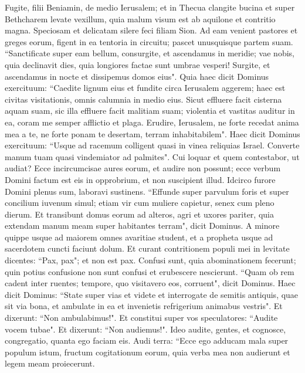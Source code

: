 \begin{biblechapter}  
\verse Fugite, filii Beniamin, de medio Ierusalem; et in Thecua clangite bucina et super Bethcharem levate vexillum, quia malum visum est ab aquilone et contritio magna. 
\verse Speciosam et delicatam silere feci filiam Sion. 
\verse Ad eam venient pastores et greges eorum, figent in ea tentoria in circuitu; pascet unusquisque partem suam. 
\verse “Sanctificate super eam bellum, consurgite, et ascendamus in meridie; vae nobis, quia declinavit dies, quia longiores factae sunt umbrae vesperi! 
\verse Surgite, et ascendamus in nocte et dissipemus domos eius". 
\verse Quia haec dicit Dominus exercituum: “Caedite lignum eius et fundite circa Ierusalem aggerem; haec est civitas visitationis, omnis calumnia in medio eius. 
\verse Sicut effluere facit cisterna aquam suam, sic illa effluere facit malitiam suam; violentia et vastitas auditur in ea, coram me semper afflictio et plaga. 
\verse Erudire, Ierusalem, ne forte recedat anima mea a te, ne forte ponam te desertam, terram inhabitabilem". 
\verse Haec dicit Dominus exercituum: “Usque ad racemum colligent quasi in vinea reliquias Israel. Converte manum tuam quasi vindemiator ad palmites". 
\verse Cui loquar et quem contestabor, ut audiat? Ecce incircumcisae aures eorum, et audire non possunt; ecce verbum Domini factum est eis in opprobrium, et non suscipient illud. 
\verse Idcirco furore Domini plenus sum, laboravi sustinens. “Effunde super parvulum foris et super concilium iuvenum simul; etiam vir cum muliere capietur, senex cum pleno dierum. 
\verse Et transibunt domus eorum ad alteros, agri et uxores pariter, quia extendam manum meam super habitantes terram", dicit Dominus. 
\verse A minore quippe usque ad maiorem omnes avaritiae student, et a propheta usque ad sacerdotem cuncti faciunt dolum. 
\verse Et curant contritionem populi mei in levitate dicentes: “Pax, pax"; et non est pax. 
\verse Confusi sunt, quia abominationem fecerunt; quin potius confusione non sunt confusi et erubescere nescierunt. “Quam ob rem cadent inter ruentes; tempore, quo visitavero eos, corruent", dicit Dominus. 
\verse Haec dicit Dominus: “State super vias et videte et interrogate de semitis antiquis, quae sit via bona, et ambulate in ea et invenietis refrigerium animabus vestris". Et dixerunt: “Non ambulabimus!". 
\verse Et constitui super vos speculatores: “Audite vocem tubae". Et dixerunt: “Non audiemus!". 
\verse Ideo audite, gentes, et cognosce, congregatio, quanta ego faciam eis. 
\verse Audi terra: “Ecce ego adducam mala super populum istum, fructum cogitationum eorum, quia verba mea non audierunt et legem meam proiecerunt. 

\end{biblechapter}
